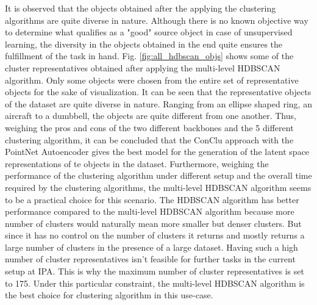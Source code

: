 It is observed that the objects obtained after the applying the clustering algorithms are quite diverse in nature. Although there is no known objective way to determine what qualifies as a "good" source object in case of unsupervised learning, the diversity in the objects obtained in the end quite ensures the fulfillment of the task in hand. Fig. \ref{fig:all_hdbscan_objs} shows some of the cluster representatives obtained after applying the multi-level \ac{HDBSCAN} algorithm. Only some objects were chosen from the entire set of representative objects for the sake of visualization. It can be seen that the representative objects of the dataset are quite diverse in nature. Ranging from an ellipse shaped ring, an aircraft to a dumbbell, the objects are quite different from one another. Thus, weighing the pros and cons of the two different backbones and the 5 different clustering algorithm, it can be concluded that the ConClu approach with the PointNet Autoencoder gives the best model for the generation of the latent space representations of te objects in the dataset. Furthermore, weighing the performance of the clustering algorithm under different setup and the overall time required by the clustering algorithms, the multi-level \ac{HDBSCAN} algorithm seems to be a practical choice for this scenario. The \ac{HDBSCAN} algorithm has better performance compared to the multi-level \ac{HDBSCAN} algorithm because more number of clusters would naturally mean more smaller but denser clusters. But since it has no control on the number of clusters it returns and mostly returns a large number of clusters in the presence of a large dataset. Having such a high number of cluster representatives isn't feasible for further tasks in the current setup at \ac{IPA}. This is why the maximum number of cluster representatives is set to 175. Under this particular constraint, the multi-level \ac{HDBSCAN} algorithm is the best choice for clustering algorithm in this use-case. 
\cleardoublepage